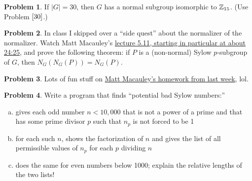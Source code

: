 \documentclass[12pt]{article}
\theoremstyle{definition} %
\newtheorem{problem}{Problem}
\begin{document}
\begin{problem}
  If $|G| = 30$, then $G$ has a normal subgroup isomorphic to $\mathbb{Z}_{15}$. (Use Problem $\ref{30}$.)
\end{problem}

\begin{problem}
  In class I skipped over a ``side quest'' about the normalizer of the normalizer. Watch Matt Macauley's \href{https://youtu.be/yTyUdci7TTY?feature=shared&t=1465}{lecture 5.11, starting in particular at about 24:25}, and prove the following theorem: if $P$ is a (non-normal) Sylow $p$-subgroup of $G$, then $N_G(N_G(P)) = N_G(P)$. 
\end{problem}

\begin{problem}
  Lots of fun stuff on \href{https://www.math.clemson.edu/~macaule/classes/s25_math4120/hw/s25_math4120_hw12.pdf}{Matt Macauley's homework from last week}, lol.
\end{problem}

\begin{problem}
  Write a program that finds ``potential bad Sylow numbers:''
  \begin{enumerate}[(a)]
    \item gives each odd number $n<10,000$ that is not a power of a prime and that has some prime divisor $p$ such that $n_p$ is not forced to be 1
    \item for each such $n$, shows the factorization of $n$ and gives the list of all permissible values of $n_p$ for each $p$ dividing $n$
    \item does the same for even numbers below 1000; explain the relative lengths of the two lists!
  \end{enumerate}
\end{problem}
\end{document}
